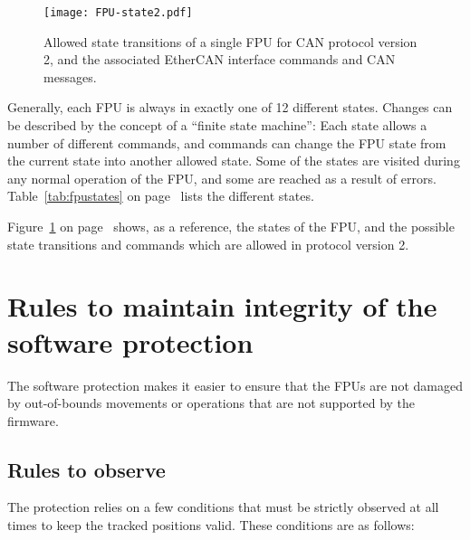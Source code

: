 \documentclass[fontsize=12,a4paper]{scrreprt}
\begin{document}
\begin{figure}
  \texttt{[image: FPU-state2.pdf]}
  \caption{Allowed state transitions of a single FPU for CAN protocol
    version 2, and the associated EtherCAN interface commands and CAN messages.}
  \label{fig:states}
\end{figure}


Generally, each FPU is always in exactly one of 12 different states.
Changes can be described by the concept of a ``finite state machine'':
Each state allows a number of different commands, and commands can
change the FPU state from the current state into another allowed
state.  Some of the states are visited during any normal operation of
the FPU, and some are reached as a result of errors.
Table~\ref{tab:fpustates} on page~\pageref{tab:fpustates} lists the
different states.


Figure~\ref{fig:states} on page~\pageref{fig:states} shows, as a
reference, the states of the FPU, and the possible state transitions
and commands which are allowed in protocol version 2.


\chapter{Rules to maintain integrity of the software protection}
\label{sec:protectionrules}

\minitoc

The software protection makes it easier to ensure that the FPUs are
not damaged by out-of-bounds movements or operations that are not
supported by the firmware.

\section{Rules to observe}
The protection relies on a few conditions that must be strictly
observed at all times to keep the tracked positions valid. These
conditions are as follows:
\end{document}

